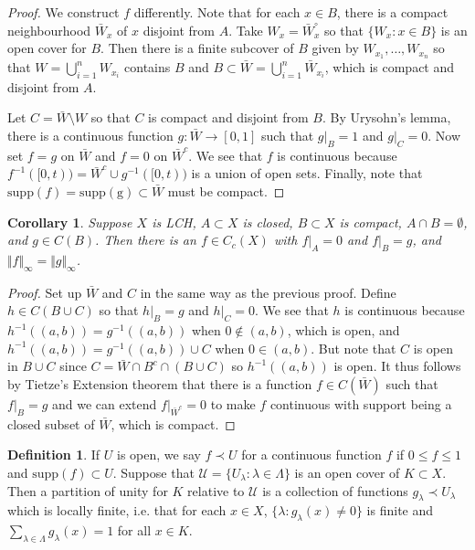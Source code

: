 \documentclass[11pt]{amsart}
\newtheorem{corollary}[theorem]{Corollary}
\theoremstyle{definition}
\newtheorem{definition}[theorem]{Definition}
\numberwithin{equation}{section}
\begin{document}
\begin{proof}
    We construct $f$ differently. Note that for each $x\in B$, there is a compact neighbourhood $\bar W_x$ of $x$ disjoint from $A$. Take $W_x=\bar W_x^\circ$ so that $\{W_x:x\in B\}$ is an open cover for $B$. Then there is a finite subcover of $B$ given by $W_{x_1},\ldots,W_{x_n}$ so that $W=\bigcup_{i=1}^nW_{x_i}$ contains $B$ and $B\subset \bar W=\bigcup_{i=1}^n\bar W_{x_i}$, which is compact and disjoint from $A$.

    Let $C=\bar W\setminus W$ so that $C$ is compact and disjoint from $B$. By Urysohn's lemma, there is a continuous function $g:\bar W\to [0,1]$ such that $g|_B=1$ and $g|_C=0$. Now set $f=g$ on $\bar W$ and $f=0$ on $\bar W^c$. We see that $f$ is continuous because $f^{-1}([0,t))=\bar W^c\cup g^{-1}([0,t))$ is a union of open sets. Finally, note that $\mathrm{supp}(f)=\mathrm{supp(g)}\subset\bar W$ must be compact.
\end{proof}
\begin{corollary}
    Suppose $X$ is LCH, $A\subset X$ is closed, $B\subset X$ is compact, $A\cap B=\emptyset$, and $g\in C(B)$. Then there is an $f\in C_c(X)$ with $f|_A=0$ and $f|_B=g$, and $\Vert f\Vert_\infty=\Vert g\Vert_\infty$.
\end{corollary}
\begin{proof}
    Set up $\bar W$ and $C$ in the same way as the previous proof. Define $h\in C(B\cup C)$ so that $h|_B=g$ and $h|_C=0$. We see that $h$ is continuous because $h^{-1}((a,b))=g^{-1}((a,b))$ when $0\not\in (a,b)$, which is open, and $h^{-1}((a,b))=g^{-1}((a,b))\cup C$ when $0\in (a,b)$. But note that $C$ is open in $B\cup C$ since $C=\bar W\cap B^c\cap (B\cup C)$ so $h^{-1}((a,b))$ is open. It thus follows by Tietze's Extension theorem that there is a function $f\in C(\bar W)$ such that $f|_{B}=g$ and we can extend $f|_{\bar W^c}=0$ to make $f$ continuous with support being a closed subset of $\bar W$, which is compact.
\end{proof}
\begin{definition}
    If $U$ is open, we say $f\prec U$ for a continuous function $f$ if $0\le f\le 1$ and $\mathrm{supp}(f)\subset U$. Suppose that $\mathcal U=\{U_\lambda:\lambda\in \Lambda\}$ is an open cover of $K\subset X$. Then a partition of unity for $K$ relative to $\mathcal U$ is a collection of functions $g_\lambda\prec U_\lambda$ which is locally finite, i.e. that for each $x\in X$,  $\{\lambda:g_\lambda(x)\ne0\}$ is finite and $\sum_{\lambda\in\Lambda}g_\lambda(x)=1$ for all $x\in K$.
\end{definition}
\end{document}
